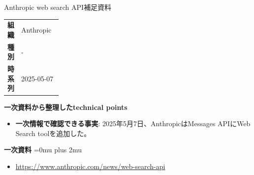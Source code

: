 \begin{technicalnote}{Anthropic web search API}{補足資料}
\begingroup
\begin{tabularx}{\linewidth}{@{}>{\bfseries}p{0.22\linewidth}X@{}}
組織 & Anthropic \\
種別 & - \\
時系列 & 2025-05-07 \\
\end{tabularx}
\smallskip
{\bfseries 一次資料から整理したtechnical points}
\begin{itemize}[leftmargin=1.5em,itemsep=0.35em]
\item \textbf{一次情報で確認できる事実}: 2025年5月7日、AnthropicはMessages APIにWeb Search toolを追加した。
\end{itemize}
\begin{samepage}
{\bfseries 一次資料}
\begingroup\sloppy
\Urlmuskip=0mu plus 2mu\relax
\begin{itemize}[leftmargin=1.5em,itemsep=0.25em]
\item {\scriptsize\url{https://www.anthropic.com/news/web-search-api}}
\end{itemize}
\endgroup
\end{samepage}
\endgroup
\end{technicalnote}
\medskip
